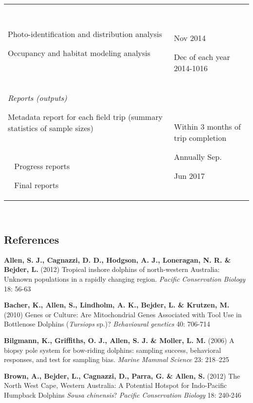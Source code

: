 \documentclass[version=last,
    paper=a4,                               %
    10pt,                                   %
    dvipsnames,
    oneside,                              %
    headings=openany,                       %
    open=any,
    BCOR=7mm,                               %
    DIV=15,     %
]{scrbook}
\begin{document}
\begin{longtable}[]{@{}ll@{}}
\begin{minipage}[t]{0.47\columnwidth}
Photo-identification and distribution analysis

Occupancy and habitat modeling analysis\strut
\end{minipage} & \begin{minipage}[t]{0.47\columnwidth}\raggedright
~

Nov 2014

Dec of each year 2014-1016\strut
\end{minipage}\tabularnewline
\begin{minipage}[t]{0.47\columnwidth}\raggedright
\emph{Reports (outputs)}

Metadata report for each field trip (summary statistics of sample sizes)

~~~~~~~~~~~~~~~~~~~~~~~~~~

~ Progress reports

~ Final reports\strut
\end{minipage} & \begin{minipage}[t]{0.47\columnwidth}\raggedright
~

Within 3 months of trip completion

Annually Sep.

Jun 2017\strut
\end{minipage}\tabularnewline
\bottomrule
\end{longtable}

~




\subsection*{References}

\textbf{Allen, S. J., Cagnazzi, D. D., Hodgson, A. J., Loneragan, N. R.
\& Bejder, L.} (2012) Tropical inshore dolphins of north-western
Australia: Unknown populations in a rapidly changing region.
\emph{Pacific Conservation Biology} 18: 56-63

\textbf{Bacher, K., Allen, S., Lindholm, A. K., Bejder, L. \& Krutzen,
M.} (2010) Genes or Culture: Are Mitochondrial Genes Associated with
Tool Use in Bottlenose Dolphins (\emph{Tursiops} sp.)? \emph{Behavioural
genetics} 40: 706-714

\textbf{Bilgmann, K., Griffiths, O. J., Allen, S. J. \& Moller, L. M.}
(2006) A biopsy pole system for bow-riding dolphins: sampling success,
behavioral responses, and test for sampling bias. \emph{Marine Mammal
Science} 23: 218--225

\textbf{Brown, A., Bejder, L., Cagnazzi, D., Parra, G. \& Allen, S.}
(2012) The North West Cape, Western Australia: A Potential Hotspot for
Indo-Pacific Humpback Dolphins \emph{Sousa chinensis}? \emph{Pacific
Conservation Biology} 18: 240-246
\end{document}

